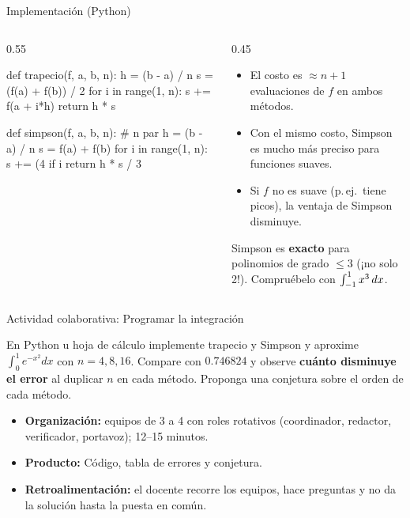 \documentclass[10pt,aspectratio=169]{beamer}
\begin{document}
\begin{frame}[fragile]{Implementación (Python)}
  \begin{columns}
    \begin{column}{0.55\textwidth}
\begin{semiverbatim}\small
def trapecio(f, a, b, n):
    h = (b - a) / n
    s = (f(a) + f(b)) / 2
    for i in range(1, n):
        s += f(a + i*h)
    return h * s

def simpson(f, a, b, n):  # n par
    h = (b - a) / n
    s = f(a) + f(b)
    for i in range(1, n):
        s += (4 if i %
    return h * s / 3
\end{semiverbatim}
    \end{column}
    \begin{column}{0.45\textwidth}
      \begin{itemize}
        \item El costo es $\approx n+1$ evaluaciones de $f$ en ambos métodos.
        \item Con el mismo costo, Simpson es mucho más preciso para funciones suaves.
        \item Si $f$ no es suave (p.\,ej.\ tiene picos), la ventaja de Simpson disminuye.
      \end{itemize}
      \begin{observacion}
        Simpson es \textbf{exacto} para polinomios de grado $\le3$ (¡no solo 2!). Compruébelo con $\int_{-1}^1x^3\,dx$.
      \end{observacion}
    \end{column}
  \end{columns}
\end{frame}

\begin{frame}{Actividad colaborativa: Programar la integración}
  \small
  \begin{activa}
    En Python u hoja de cálculo implemente trapecio y Simpson y aproxime $\int_0^1e^{-x^2}dx$ con $n=4,8,16$. Compare con $0.746824$ y observe \textbf{cuánto disminuye el error} al duplicar $n$ en cada método. Proponga una conjetura sobre el orden de cada método.
  \end{activa}
  \begin{itemize}
    \item \textbf{Organización:} equipos de 3 a 4 con roles rotativos (coordinador, redactor, verificador, portavoz); 12--15 minutos.
    \item \textbf{Producto:} Código, tabla de errores y conjetura.
    \item \textbf{Retroalimentación:} el docente recorre los equipos, hace preguntas y no da la solución hasta la puesta en común.
  \end{itemize}
\end{frame}
\end{document}
